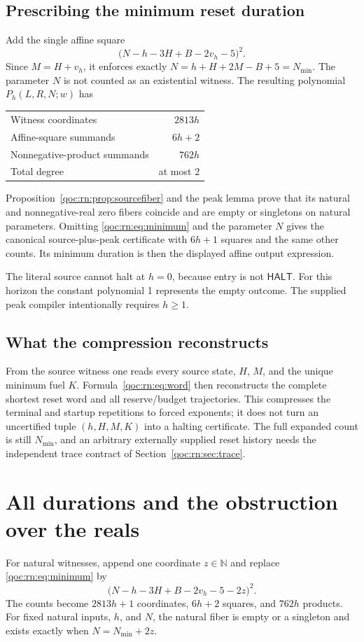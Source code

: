 \documentclass[11pt,letterpaper]{article}
\theoremstyle{definition}
\theoremstyle{remark}
\newcommand{\N}{\mathbb N}
\newcommand{\HALT}{\mathsf{HALT}}
\begin{document}
\subsection{Prescribing the minimum reset duration}
Add the single affine square
\begin{equation}
 \bigl(N-h-3H+B-2v_h-5\bigr)^2.
 \label{qoc:rn:eq:minimum}
\end{equation}
Since $M=H+v_h$, it enforces exactly $N=h+H+2M-B+5=N_{\min}$. The parameter $N$ is not counted as an existential witness. The resulting polynomial $P_h(L,R,N;w)$ has
\begin{center}
\begin{tabular}{lr}
\toprule
Witness coordinates & $2813h$\\
Affine-square summands & $6h+2$\\
Nonnegative-product summands & $762h$\\
Total degree & at most $2$\\\bottomrule
\end{tabular}
\end{center}
Proposition~\ref{qoc:rn:prop:sourcefiber} and the peak lemma prove that its natural and nonnegative-real zero fibers coincide and are empty or singletons on natural parameters. Omitting \eqref{qoc:rn:eq:minimum} and the parameter $N$ gives the canonical source-plus-peak certificate with $6h+1$ squares and the same other counts. Its minimum duration is then the displayed affine output expression.

The literal source cannot halt at $h=0$, because entry is not $\HALT$. For this horizon the constant polynomial 1 represents the empty outcome. The supplied peak compiler intentionally requires $h\geq1$.

\subsection{What the compression reconstructs}
From the source witness one reads every source state, $H$, $M$, and the unique minimum fuel $K$. Formula~\eqref{qoc:rn:eq:word} then reconstructs the complete shortest reset word and all reserve/budget trajectories. This compresses the terminal and startup repetitions to forced exponents; it does not turn an uncertified tuple $(h,H,M,K)$ into a halting certificate. The full expanded count is still $N_{\min}$, and an arbitrary externally supplied reset history needs the independent trace contract of Section~\ref{qoc:rn:sec:trace}.

\section{All durations and the obstruction over the reals}
\label{qoc:rn:sec:parity}
For natural witnesses, append one coordinate $z\in\N$ and replace \eqref{qoc:rn:eq:minimum} by
\begin{equation}
 \bigl(N-h-3H+B-2v_h-5-2z\bigr)^2.
 \label{qoc:rn:eq:padding}
\end{equation}
The counts become $2813h+1$ coordinates, $6h+2$ squares, and $762h$ products. For fixed natural inputs, $h$, and $N$, the natural fiber is empty or a singleton and exists exactly when $N=N_{\min}+2z$.
\end{document}

